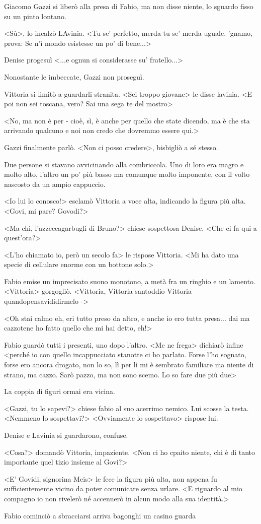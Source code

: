 Giacomo Gazzi si liberò alla presa di Fabio, ma non disse niente, lo sguardo fisso su un pinto lontano. 

<Sù>, lo incalzò LAvinia. <Tu se' perfetto, merda tu se' merda uguale. 'gnamo, prova: Se n'ì mondo esistesse un po' di bene...>

Denise progesuì <...e ognun si considerasse su' fratello...>

Nonostante le imbeccate, Gazzi non proseguì.

Vittoria si limitò a guardarli stranita. <Sei troppo giovane> le disse lavinia. <E poi non sei toscana, vero? Sai una sega te del mostro>

<No, ma non è per - cioè, sì, è anche per quello che state dicendo, ma è che sta arrivando qualcuno e noi non credo che dovremmo essere qui.> 

Gazzi finalmente parlò. <Non ci posso credere>, bisbigliò a sé stesso.

Due persone si stavano avvicinando alla combriccola. Uno di loro era magro e molto alto, l'altro un po' più basso ma comunque molto imponente, con il volto nascosto da un ampio cappuccio.

<Io lui lo conosco!> esclamò Vittoria a voce alta, indicando la figura più alta. <Govi, mi pare? Govodi?>

<Ma chi, l'azzeccagarbugli di Bruno?> chiese sospettosa Denise. <Che ci fa qui a quest'ora?>

<L'ho chiamato io, però un secolo fa> le rispose Vittoria. <Mi ha dato una specie di cellulare enorme con un bottone solo.>

Fabio emise un imprecisato suono monotono, a metà fra un ringhio e un lamento.<Vittoria> gorgogliò. <Vittoria, Vittoria santoddio Vittoria quandopensavididirmelo ->

<Oh stai calmo eh, eri tutto preso da altro, e anche io ero tutta presa... dai ma cazzotene ho fatto quello che mi hai detto, eh!>

Fabio guardò tutti i presenti, uno dopo l'altro. <Me ne frega> dichiarò infine <perché io con quello incappucciato stanotte ci ho parlato. Forse l'ho sognato, forse ero ancora drogato, non lo so, lì per lì  mi è sembrato familiare ma niente di strano, ma cazzo. Sarò pazzo, ma non sono scemo. Lo so fare due più due>

La coppia di figuri ormai era vicina.

<Gazzi, tu lo sapevi?> chiese fabio al suo acerrimo nemico. Lui scosse la testa. <Nemmeno lo sospettavi?> <Ovviamente lo sospettavo> rispose lui.

Denise e Lavinia si guardarono, confuse.

<Cosa?> domandò Vittoria, impaziente. <Non ci ho cpaito niente, chi è di tanto importante quel tizio insieme al Govi?>

<E' Govidi, signorina Meis> le fece la figura più alta, non appena fu sufficientemente vicino da poter comunicare senza urlare. <E riguardo al mio compagno io non rivelerò né accennerò in alcun modo alla sua identità.>



Fabio cominciò a sbracciarsi
arriva bagonghi un casino guarda
